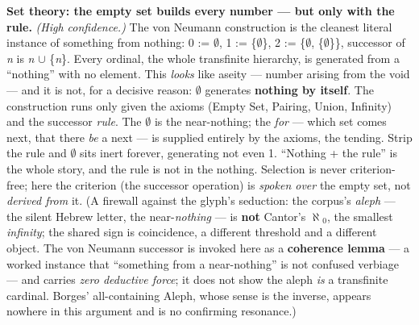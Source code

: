 \documentclass[11pt]{article}
\begin{document}
\textbf{Set theory: the empty set builds every number — but only with the rule.} \emph{(High confidence.)} The von Neumann construction is the cleanest literal instance of something from nothing: 0 := \ensuremath{\emptyset}, 1 := \{\ensuremath{\emptyset}\}, 2 := \{\ensuremath{\emptyset}, \{\ensuremath{\emptyset}\}\}, successor of \emph{n} is \emph{n} \ensuremath{\cup} \{\emph{n}\}. Every ordinal, the whole transfinite hierarchy, is generated from a ``nothing'' with no element. This \emph{looks} like aseity — number arising from the void — and it is not, for a decisive reason: \ensuremath{\emptyset} generates \textbf{nothing by itself}. The construction runs only given the axioms (Empty Set, Pairing, Union, Infinity) and the successor \emph{rule}. The \ensuremath{\emptyset} is the near-nothing; the \emph{for} — which set comes next, that there \emph{be} a next — is supplied entirely by the axioms, the tending. Strip the rule and \ensuremath{\emptyset} sits inert forever, generating not even 1. ``Nothing + the rule'' is the whole story, and the rule is not in the nothing. Selection is never criterion-free; here the criterion (the successor operation) is \emph{spoken over} the empty set, not \emph{derived from} it. (A firewall against the glyph's seduction: the corpus's \emph{aleph} — the silent Hebrew letter, the near-\emph{nothing} — is \textbf{not} Cantor's \ensuremath{\aleph}\ensuremath{_{0}}, the smallest \emph{infinity}; the shared sign is coincidence, a different threshold and a different object. The von Neumann successor is invoked here as a \textbf{coherence lemma} — a worked instance that ``something from a near-nothing'' is not confused verbiage — and carries \emph{zero deductive force}; it does not show the aleph \emph{is} a transfinite cardinal. Borges' all-containing Aleph, whose sense is the inverse, appears nowhere in this argument and is no confirming resonance.)
\end{document}
